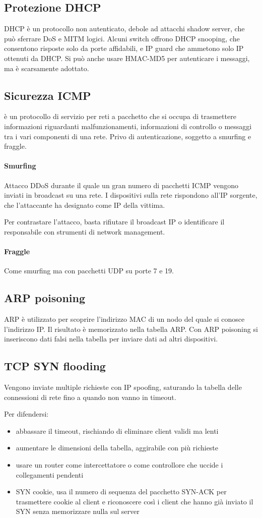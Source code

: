 \documentclass[11pt]{article}
\begin{document}
\subsection{Protezione DHCP}
DHCP è un protocollo non autenticato, debole ad attacchi shadow server, che può sferrare DoS e MITM logici.
Alcuni switch offrono DHCP snooping, che consentono risposte solo da porte affidabili, e IP guard che ammetono solo IP 
ottenuti da DHCP. Si può anche usare HMAC-MD5 per autenticare i messaggi, ma è scarsamente adottato.
\subsection{Sicurezza ICMP}
è un protocollo di servizio per reti a pacchetto che si occupa di trasmettere informazioni riguardanti malfunzionamenti, 
informazioni di controllo o messaggi tra i vari componenti di una rete. Privo di autenticazione, soggetto a smurfing e fraggle.
\paragraph*{Smurfing}
Attacco DDoS durante il quale un gran numero di pacchetti ICMP vengono inviati in broadcast su una rete. I dispositivi 
sulla rete rispondono all'IP sorgente, che l'attaccante ha designato come IP della vittima.

Per contrastare l'attacco, basta rifiutare il broadcast IP o identificare il responsabile con strumenti di network management.
\paragraph*{Fraggle}
Come smurfing ma con pacchetti UDP su porte 7 e 19.
\subsection{ARP poisoning}
ARP è utilizzato per scoprire l'indirizzo MAC di un nodo del quale si conosce l'indirizzo IP. Il risultato è memorizzato 
nella tabella ARP. Con ARP poisoning si inseriscono dati falsi nella tabella per inviare dati ad altri dispositivi.
\subsection{TCP SYN flooding}
Vengono inviate multiple richieste con IP spoofing, saturando la tabella delle connessioni di rete fino a quando non vanno
in timeout.

Per difendersi:
\begin{itemize}
    \item abbassare il timeout, rischiando di eliminare client validi ma lenti
    \item aumentare le dimensioni della tabella, aggirabile con più richieste 
    \item usare un router come intercettatore o come controllore che uccide i collegamenti pendenti
    \item SYN cookie, usa il numero di sequenza del pacchetto SYN-ACK per trasmettere cookie al client e riconoscere così 
    i client che hanno già inviato il SYN senza memorizzare nulla sul server
\end{itemize}
\end{document}
